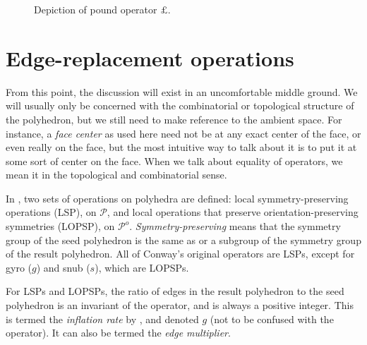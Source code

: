 \documentclass{amsart}[12pt]
\begin{document}
\begin{figure}

\caption{Depiction of pound operator $\pounds$.}
\label{fig:pound}
\end{figure}

\section{Edge-replacement operations}
From this point, the discussion will exist in an uncomfortable middle ground.
We will usually only be concerned with the combinatorial or topological
structure of the polyhedron, but we still need to make reference to the ambient
space. For instance, a \textit{face center} as used here need not be at any
exact center of the face, or even really on the face, but the most intuitive
way to talk about it is to put it at some sort of center on the face. When we
talk about equality of operators, we mean it in the topological and combinatorial sense.

In \cite{brinkmann}, two sets of operations on polyhedra are defined: local
symmetry-preserving operations (LSP), on $\mathcal{P}$, and local operations
that preserve orientation-preserving symmetries (LOPSP), on $\mathcal{P}^o$.
\textit{Symmetry-preserving} means that the symmetry group of the seed
polyhedron is the same as or a subgroup of the symmetry group of the result
polyhedron. All of Conway's original operators are LSPs,
except for gyro ($g$) and snub ($s$), which are LOPSPs.

For LSPs and LOPSPs, the ratio of edges in the result polyhedron to the seed
polyhedron is an invariant of the operator, and is always a positive integer.
This is termed the \textit{inflation rate} by \cite{brinkmann},
and denoted $g$ (not to be confused with the operator).
It can also be termed the \textit{edge multiplier}.
\end{document}
